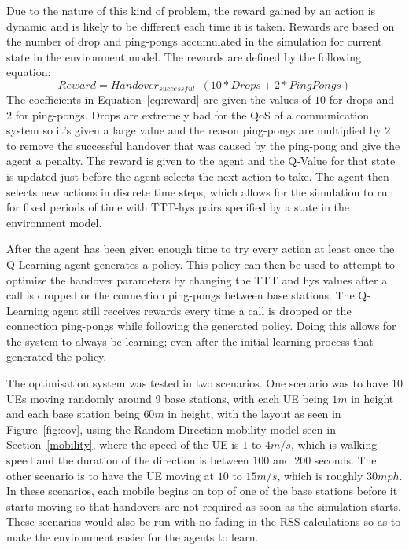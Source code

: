 Due to the nature of this kind of problem, the reward gained by an action is dynamic and is likely to be different each time it is taken. Rewards are based on the number of drop and ping-pongs accumulated in the simulation for current state in the environment model. The rewards are defined by the following equation:
\begin{equation}\label{eq:reward}
Reward = Handover_{successful} – (10*Drops + 2*PingPongs)
\end{equation}
The coefficients in Equation~\ref{eq:reward} are given the values of $10$ for drops and $2$ for ping-pongs. Drops are extremely bad for the QoS of a communication system so it's given a large value and the reason ping-pongs are multiplied by $2$ to remove the successful handover that was caused by the ping-pong and give the agent a penalty. The reward is given to the agent and the Q-Value for that state is updated just before the agent selects the next action to take.  The agent then selects new actions in discrete time steps, which allows for the simulation to run for fixed periods of time with TTT-hys pairs specified by a state in the environment model. 

After the agent has been given enough time to try every action at least once the Q-Learning agent generates a policy. This policy can then be used to attempt to optimise the handover parameters by changing the TTT and hys values after a call is dropped or the connection ping-pongs between base stations. The Q-Learning agent still receives rewards every time a call is dropped or the connection ping-pongs while following the generated policy. Doing this allows for the system to always be learning; even after the initial learning process that generated the policy.

The optimisation system was tested in two scenarios. One scenario was to have 10 UEs moving randomly around 9 base stations, with each UE being $1 m$ in height and each base station being $60 m$ in height, with the layout as seen in Figure~\ref{fig:cov}, using the Random Direction mobility model seen in Section~\ref{mobility}, where the speed of the UE is $1$ to $4 m/s$, which is walking speed and the duration of the direction is between $100$ and $200$ seconds. The other scenario is to have the UE moving at $10$ to $15 m/s$, which is roughly $30 mph$. In these scenarios, each mobile begins on top of one of the base stations before it starts moving so that handovers are not required as soon as the simulation starts. These scenarios would also be run with no fading in the RSS calculations so as to make the environment easier for the agents to learn.

